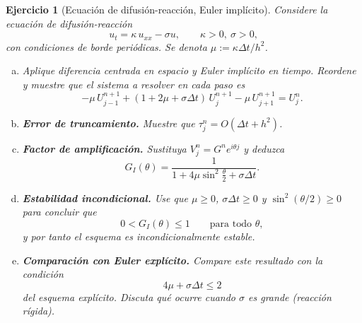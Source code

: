 \documentclass[12pt]{article}
\newtheorem{exercise}{Ejercicio}
\def\dt{\Delta t}
\begin{document}
\begin{exercise}[Ecuación de difusión-reacción, Euler implícito]
Considere la ecuación de difusión-reacción
\[
  u_t = \kappa\,u_{xx} - \sigma u,\qquad \kappa>0,\ \sigma>0,
\]
con condiciones de borde periódicas. Se denota $\mu:=\kappa\dt/h^2$.
\begin{enumerate}[(a)]
\item Aplique diferencia centrada en espacio y Euler implícito en tiempo. Reordene y muestre que el sistema a resolver en cada paso es
\[
  -\mu\,U_{j-1}^{n+1} + (1+2\mu+\sigma\dt)\,U_j^{n+1} - \mu\,U_{j+1}^{n+1} = U_j^n.
\]

\item \textbf{Error de truncamiento.} Muestre que $\tau_j^n = O(\dt + h^2)$.

\item \textbf{Factor de amplificación.} Sustituya $V_j^n = G^n e^{i\theta j}$ y deduzca
\[
  G_I(\theta) = \frac{1}{1 + 4\mu\sin^2\!\tfrac{\theta}{2} + \sigma\dt}.
\]

\item \textbf{Estabilidad incondicional.} Use que $\mu\ge 0$, $\sigma\dt\ge 0$ y $\sin^2(\theta/2)\ge 0$ para concluir que
\[
  0 < G_I(\theta) \le 1\qquad\text{para todo }\theta,
\]
y por tanto el esquema es incondicionalmente estable.

\item \textbf{Comparación con Euler explícito.} Compare este resultado con la condición
\[
  4\mu + \sigma\dt \le 2
\]
del esquema explícito. Discuta qué ocurre cuando $\sigma$ es grande (reacción rígida).
\end{enumerate}
\end{exercise}
\end{document}
